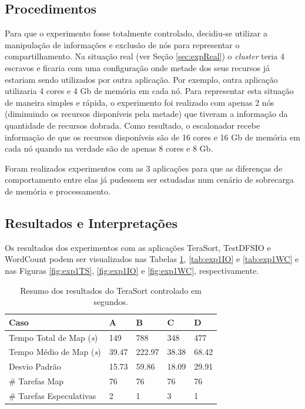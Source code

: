 \subsection{Procedimentos}
Para que o experimento fosse totalmente controlado, decidiu-se utilizar a manipulação de informações e exclusão de nós para representar o compartilhamento. Na situação real (ver Seção \ref{sec:expReal}) o \textit{cluster} teria 4 escravos e ficaria com uma configuração onde metade dos seus recursos já estariam sendo utilizados por outra aplicação. Por exemplo, outra aplicação utilizaria 4 cores e 4 Gb de memória em cada nó. Para representar esta situação de maneira simples e rápida, o experimento foi realizado com apenas 2 nós (diminuindo os recursos disponíveis pela metade) que tiveram a informação da quantidade de recursos dobrada. Como resultado, o escalonador recebe informação de que os recursos disponíveis são de 16 cores e 16 Gb de memória em cada nó quando na verdade são de apenas 8 cores e 8 Gb. 

Foram realizados experimentos com as 3 aplicações para que as diferenças de comportamento entre elas já pudessem ser estudadas num cenário de sobrecarga de memória e processamento.

\subsection{Resultados e Interpretações}
Os resultados dos experimentos com as aplicações TeraSort, TestDFSIO e WordCount podem ser visualizados nas Tabelas \ref{tab:exp1TS}, \ref{tab:exp1IO} e \ref{tab:exp1WC} e nas Figuras \ref{fig:exp1TS}, \ref{fig:exp1IO} e \ref{fig:exp1WC}, respectivamente.

\begin{table}[h!]
	\caption{Resumo dos resultados do TeraSort controlado em segundos.} \label{tab:exp1TS}
	\begin{tabular*}{\hsize}{lllll} %
		\textbf{Caso} & \textbf{A} & \textbf{B} & \textbf{C} & \textbf{D}\\
		\hline
		Tempo Total de Map ({\it{s}}) & 149 & 788 & 348 & 477 \\
		Tempo Médio de Map ({\it{s}}) & 39.47 & 222.97 & 38.38 & 68.42 \\
		Desvio Padrão & 15.73 & 59.86 & 18.09 & 29.91 \\
		\# Tarefas Map & 76 & 76 & 76 & 76 \\
		\# Tarefas Especulativas & 2 & 1 & 3 & 1 \\
	\end{tabular*}
\end{table}

